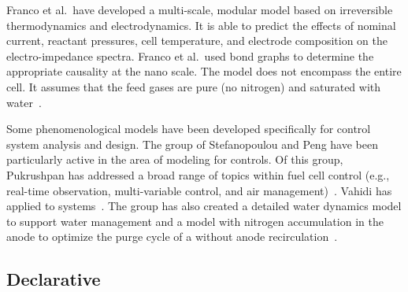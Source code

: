 Franco et al.\ have developed a multi-scale, modular  model based on irreversible thermodynamics and electrodynamics.  It is able to predict the effects of nominal current, reactant pressures, cell temperature, and electrode composition on the electro-impedance spectra.  Franco et al.\ used bond graphs to determine the appropriate causality at the nano scale.  The model does not encompass the entire cell.  It assumes that the feed gases are pure (no nitrogen) and saturated with water~\cite{Franco2006, Franco2007}.

Some phenomenological  models have been developed specifically for control system analysis and design.  The group of Stefanopoulou and Peng have been particularly active in the area of modeling for  controls.  Of this group, Pukrushpan has addressed a broad range of topics within fuel cell control (e.g., real-time observation, multi-variable control, and air management)~\cite{Pukrushpan2004}.  Vahidi has applied  to  systems~\cite{Vahidi2004, Vahidi2006}.  The group has also created a detailed water dynamics model to support water management and a model with nitrogen accumulation in the anode to optimize the purge cycle of a  without anode recirculation~\cite{McKay2005, Chen2013}.



\subsection{Declarative}
\label{sec:DeclarativeFC}

